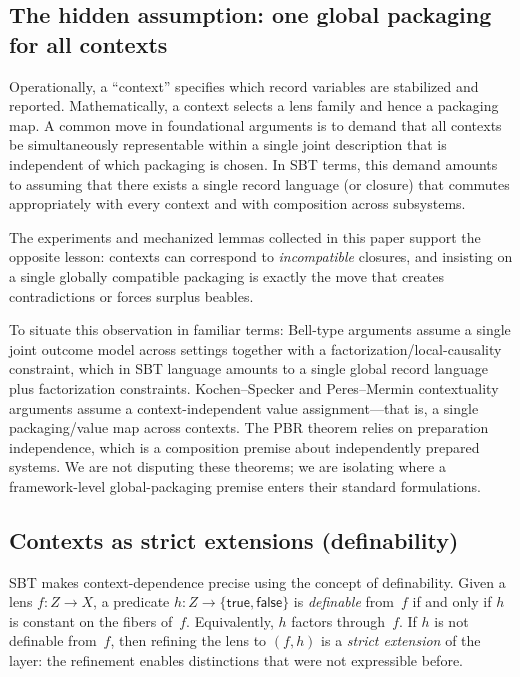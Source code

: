 \documentclass[11pt]{article}
\begin{document}
\subsection{The hidden assumption: one global packaging for all contexts}

Operationally, a ``context'' specifies which record variables are stabilized and reported.
Mathematically, a context selects a lens family and hence a packaging map.
A common move in foundational arguments is to demand that all contexts be simultaneously representable within a single joint description that is independent of which packaging is chosen.
In SBT terms, this demand amounts to assuming that there exists a single record language (or closure) that commutes appropriately with every context and with composition across subsystems.

The experiments and mechanized lemmas collected in this paper support the opposite lesson:
contexts can correspond to \emph{incompatible} closures, and insisting on a single globally compatible packaging is exactly the move that creates contradictions or forces surplus beables.

To situate this observation in familiar terms: Bell-type arguments assume a single joint outcome model across settings together with a factorization/local-causality constraint, which in SBT language amounts to a single global record language plus factorization constraints. Kochen--Specker and Peres--Mermin contextuality arguments assume a context-independent value assignment---that is, a single packaging/value map across contexts. The PBR theorem relies on preparation independence, which is a composition premise about independently prepared systems. We are not disputing these theorems; we are isolating where a framework-level global-packaging premise enters their standard formulations.

\subsection{Contexts as strict extensions (definability)}

SBT makes context-dependence precise using the concept of definability.
Given a lens $f:Z\to X$, a predicate $h:Z\to\{\mathsf{true},\mathsf{false}\}$ is \emph{definable} from~$f$ if and only if $h$ is constant on the fibers of~$f$.
Equivalently, $h$ factors through~$f$.
If $h$ is not definable from~$f$, then refining the lens to $(f,h)$ is a \emph{strict extension} of the layer: the refinement enables distinctions that were not expressible before.
\end{document}
